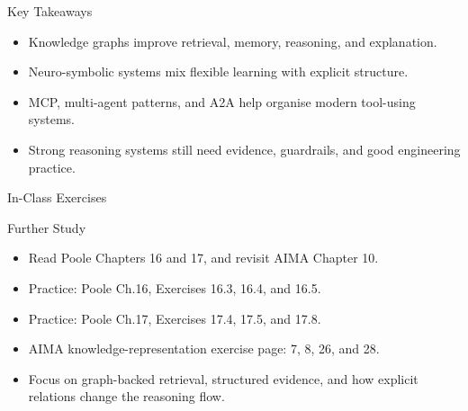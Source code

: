 \documentclass[aspectratio=169]{beamer}
\newcommand{\defaultdeckrefs}{AIMA4e Ch.10 pp.314--343; Poole3e Ch.16--17 pp.701--766; doi:10.1016/j.cosrev.2026.100902}
\newcommand{\currentsliderefs}{\defaultdeckrefs}
\newcommand{\setslideref}[1]{\gdef\currentsliderefs{#1}}
\begin{document}
\setslideref{End-of-lecture recap}
\begin{frame}{Key Takeaways}
\begin{itemize}
  \item Knowledge graphs improve retrieval, memory, reasoning, and explanation.
  \item Neuro-symbolic systems mix flexible learning with explicit structure.
  \item MCP, multi-agent patterns, and A2A help organise modern tool-using systems.
  \item Strong reasoning systems still need evidence, guardrails, and good engineering practice.
\end{itemize}
\end{frame}

\setslideref{Exercise prompt for class discussion}
\begin{frame}{In-Class Exercises}
\end{frame}

\setslideref{Practice exercises listed on this slide}
\begin{frame}{Further Study}
\begin{itemize}
  \item Read Poole Chapters 16 and 17, and revisit AIMA Chapter 10.
  \item Practice: Poole Ch.16, Exercises 16.3, 16.4, and 16.5.
  \item Practice: Poole Ch.17, Exercises 17.4, 17.5, and 17.8.
  \item AIMA knowledge-representation exercise page: 7, 8, 26, and 28.
  \item Focus on graph-backed retrieval, structured evidence, and how explicit relations change the reasoning flow.
\end{itemize}
\end{frame}
\end{document}
